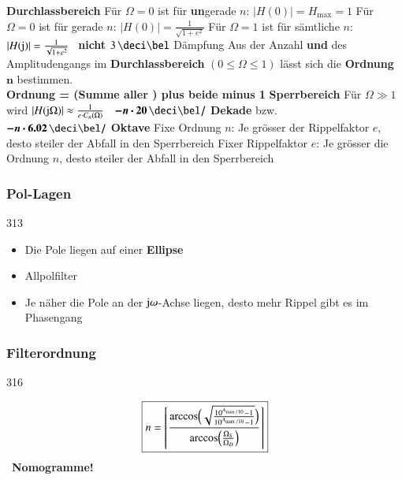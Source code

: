 \begin{outline}
    \1 \textbf{Durchlassbereich}
        \2 Für $\Omega = 0$ ist für \textbf{un}gerade $n$: $|H(0)| = H_{\max} = 1$
        \2 Für $\Omega = 0$ ist für gerade $n$: $|H(0)| = \frac{1}{\sqrt{1 + e^2}}$
        \2 Für $\Omega = 1$ ist für sämtliche $n$: $|H(\mathrm{j})| = \frac{1}{\sqrt{1 + e^2}}$ 
            \textrightarrow\ \textbf{nicht} $3 \, \deci \bel$ Dämpfung
        \2 Aus der Anzahl \textbf{ und } des Amplitudengangs im \textbf{Durchlassbereich} 
            $(0 \leq \Omega \leq 1)$ lässt sich die \textbf{Ordnung $\bm{n}$} bestimmen. \\
            \textbf{Ordnung = (Summe aller ) plus beide  minus 1}
    \1 \textbf{Sperrbereich}
        \2 Für $\Omega \gg 1$ wird $|H(\mathrm{j} \Omega)| \approx \frac{1}{e \cdot C_n(\Omega)}$ 
            \textrightarrow\ $\bm{- n \cdot 20 \, \deci \bel /}$ \textbf{Dekade} bzw.\\
            $\bm{- n \cdot 6.02 \, \deci \bel /}$ \textbf{Oktave}
        \2 Fixe Ordnung $n$: Je grösser der Rippelfaktor $e$, desto steiler der Abfall in den Sperrbereich
        \2 Fixer Rippelfaktor $e$: Je grösser die Ordnung $n$, desto steiler der Abfall in den Sperrbereich
\end{outline}


\begin{minipage}[t]{0.48\columnwidth}
    \subsubsection{Pol-Lagen}{313}

    \begin{itemize}
        \item Die Pole liegen auf einer \textbf{Ellipse}
        \item Allpolfilter
        \item Je näher die Pole an der $\mathrm{j} \omega$-Achse liegen, desto mehr Rippel gibt es im Phasengang %
    \end{itemize}
\end{minipage}
\hfill
\begin{minipage}[t]{0.48\columnwidth}
    \subsubsection{Filterordnung}{316}

    $$ \boxed{ n =  \left\lceil \frac{\arccos \Bigl( \sqrt{ \frac{10^{A_{\min / 10}} - 1}{10^{A_{\max / 10}} - 1} } \Bigr) }
        {\arccos \Bigl( \frac{\Omega_S}{\Omega_D} \Bigr)}  \right\rceil } $$
    \textrightarrow\ \textbf{Nomogramme!}
\end{minipage}


